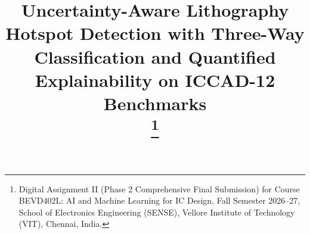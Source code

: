 \documentclass[conference]{IEEEtran}
\begin{document}
\title{Uncertainty-Aware Lithography Hotspot Detection with Three-Way Classification and Quantified Explainability on ICCAD-12 Benchmarks\\
\thanks{Digital Assignment II (Phase 2 Comprehensive Final Submission) for Course BEVD402L: AI and Machine Learning for IC Design, Fall Semester 2026--27, School of Electronics Engineering (SENSE), Vellore Institute of Technology (VIT), Chennai, India.}
}

\author{
\and
{}
\and
{}
}

\maketitle
\end{document}
